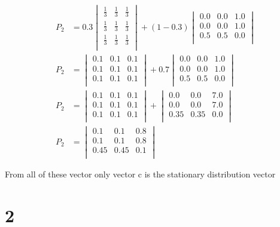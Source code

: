 \documentclass[12pt,english]{article}
\begin{document}
\begin{align*}
P_2 &=0.3
\begin{vmatrix}
\frac{1}{3} & \frac{1}{3} & \frac{1}{3}\\
\frac{1}{3} & \frac{1}{3} & \frac{1}{3}\\
\frac{1}{3} & \frac{1}{3} & \frac{1}{3}\\
\end{vmatrix}
+ (1-0.3)
\begin{vmatrix}
0.0 & 0.0 & 1.0\\
0.0 & 0.0 & 1.0\\
0.5 & 0.5 & 0.0\\
\end{vmatrix}
\\
P_2 &=
\begin{vmatrix}
0.1 & 0.1 & 0.1\\
0.1 & 0.1 & 0.1\\
0.1 & 0.1 & 0.1\\
\end{vmatrix}
+ 0.7
\begin{vmatrix}
0.0 & 0.0 & 1.0\\
0.0 & 0.0 & 1.0\\
0.5 & 0.5 & 0.0\\
\end{vmatrix}
\\
P_2 &=
\begin{vmatrix}
0.1 & 0.1 & 0.1\\
0.1 & 0.1 & 0.1\\
0.1 & 0.1 & 0.1\\
\end{vmatrix}
+ 
\begin{vmatrix}
0.0 & 0.0 & 7.0\\
0.0 & 0.0 & 7.0\\
0.35 & 0.35 & 0.0\\
\end{vmatrix}
\\
P_2 &=
\begin{vmatrix}
0.1 & 0.1 & 0.8\\
0.1 & 0.1 & 0.8\\
0.45 & 0.45 & 0.1\\
\end{vmatrix}
\end{align*}

From all of these vector only vector c is the stationary distribution vector
\section*{2}
\end{document}
